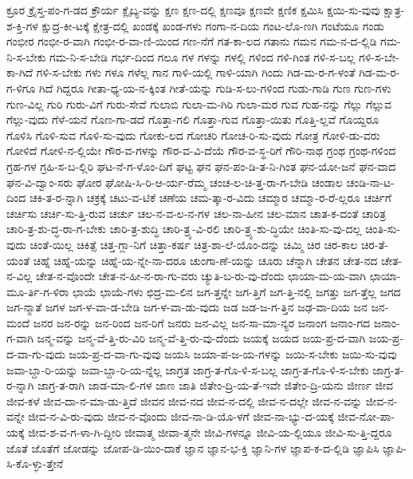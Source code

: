 {ಕ್ರೂರ
ಕ್ರೈಸ್ತ-ಪಂ-ಗ-ಡದ
ಕ್ರೌರ್ಯ
ಕ್ಲೈಬ್ಯ-ವನ್ನು
ಕ್ಷಣ
ಕ್ಷಣ-ದಲ್ಲಿ
ಕ್ಷಣವೂ
ಕ್ಷಣವೇ
ಕ್ಷಣಿಕ
ಕ್ಷಮಿಸಿ
ಕ್ಷಯಿ-ಸು-ವುವು
ಕ್ಷಾತ್ರ-ಶ-ಕ್ತಿ-ಗಳ
ಕ್ಷುದ್ರ-ಕೀ-ಟಕ್ಕೆ
ಕ್ಷೇತ್ರ-ದಲ್ಲಿ
ಖಂಡಕ್ಕೆ
ಖಂಡ-ಗಳು
ಗಂಗಾ-ನ-ದಿಯ
ಗಂಟ-ಲೊ-ಣಗಿ
ಗಂಟೆಯೂ
ಗಂಡು
ಗಂಭೀರ
ಗಂಭೀ-ರ-ವಾಗಿ
ಗಂಭೀ-ರ-ವಾ-ಣಿ-ಯಿಂದ
ಗಣ-ನೆಗೆ
ಗತ-ಕಾ-ಲದ
ಗತಾನು
ಗಮನ
ಗಮ-ನ-ದ-ಲ್ಲಿಡಿ
ಗಮ-ನಿ-ಸ-ಬೇಕು
ಗಮ-ನಿ-ಸ-ಬೇಡಿ
ಗರ್ಭ-ದಿಂದ
ಗಲೂ
ಗಳ
ಗಳನ್ನು
ಗಳಲ್ಲಿ
ಗಳಿಂದ
ಗಳಿ-ಗಿಂತ
ಗಳಿ-ಸ-ಬಲ್ಲ
ಗಳಿ-ಸ-ಬೇ-ಕಾ-ಗಿದೆ
ಗಳಿ-ಸ-ಬೇಕು
ಗಳು
ಗಳೂ
ಗಳೆಲ್ಲ
ಗಾನ
ಗಾಳಿ-ಯಲ್ಲಿ
ಗಾಳಿ-ಯಾಗಿ
ಗಿಂದು
ಗಿಡ-ಮ-ರ-ಗ-ಳಂತೆ
ಗಿಡ-ಮ-ರ-ಗ-ಳಿಗೂ
ಗಿದೆ
ಗಿದ್ದರೂ
ಗೀತಾ-ಧ್ಯ-ಯ-ನ-ಕ್ಕಿಂತ
ಗೀತೆ-ಯನ್ನು
ಗುಡಿ-ಸ-ಲು-ಗಳಿಂದ
ಗುಡು-ಗಾಡಿ
ಗುಣ
ಗುಣ-ಗಳು
ಗುಣ-ವಿಲ್ಲ
ಗುರಿ
ಗುರು-ವಿಗೆ
ಗುರು-ಸೇವೆ
ಗುಲಾಬಿ
ಗುಲಾ-ಮ-ಗಿರಿ
ಗುಲಾ-ಮರ
ಗುವ
ಗುಹ-ನನ್ನು
ಗೆಲ್ಲು
ಗೆಲ್ಲುವ
ಗೆಲ್ಲು-ವುದು
ಗೆಳೆ-ಯನೆ
ಗೊಣ-ಗಾ-ಡದೆ
ಗೊತ್ತಾ-ಗಲಿ
ಗೊತ್ತಾ-ಗುವ
ಗೊತ್ತಾ-ಯಿತು
ಗೊತ್ತಿ-ಲ್ಲವೆ
ಗೊಯ್ದರೂ
ಗೊಳಿಸಿ
ಗೊಳಿ-ಸುವ
ಗೊಳಿ-ಸು-ವುದು
ಗೋಕು-ಲದ
ಗೋಚರಿ
ಗೋಚ-ರಿ-ಸು-ವುದು
ಗೋತ್ರ
ಗೋಳಿ-ಡು-ವರು
ಗೋಳಿದೆ
ಗೋಳಿ-ನ-ಲ್ಲಿಯೇ
ಗೌರ-ವ-ಗಳನ್ನು
ಗೌರ-ವ-ವಿ-ದೆಯೆ
ಗೌರ-ವ-ಸ್ಥ-ರಿಗೆ
ಗೌರಿ-ನಾಥ
ಗ್ರಂಥ
ಗ್ರಂಥ-ಗಳಿಂದ
ಗ್ರಹ-ಗಳ
ಗ್ರಹಿ-ಸ-ಬ-ಲ್ಲಿರಿ
ಘಟ-ನೆ-ಗ-ಳೊಂ-ದಿಗೆ
ಘಟ್ಟ
ಘನ
ಘನ-ಪಂ-ಡಿ-ತ-ನಿ-ಗಿಂತ
ಘನ-ಯೋ-ಜನೆ
ಘನ-ವಾದ
ಘನ-ವಿ-ದ್ವಾಂ-ಸರು
ಘೋರ
ಘೋಷಿ-ಸಿ-ರಿ-ಆ-ರ್ಯ-ರೆಮ್ಮ
ಚಂಚ-ಲ-ಚಿ-ತ್ತ-ರಾ-ಗ-ಬೇಡಿ
ಚಂಡಾಲ
ಚಂಡಿ-ನಾ-ಟ-ದಿಂದ
ಚಕಿ-ತ-ರ-ನ್ನಾಗಿ
ಚಕ್ರಕ್ಕೆ
ಚಟು-ವ-ಟಿಕೆ
ಚಣೆಯ
ಚಮ-ತ್ಕಾ-ರ-ವಿದು
ಚಮ್ಮಾರ
ಚಮ್ಮಾ-ರ-ರೆ-ಲ್ಲರೂ
ಚರ್ಚಿಗೆ
ಚರ್ಚಿಸು
ಚರ್ಚಿ-ಸು-ತ್ತಿ-ರುವ
ಚರ್ಚು
ಚಲ-ನ-ವ-ಲ-ನ-ಗಳ
ಚಲ-ನಾ-ಹೀನ
ಚಲ-ಮಾನ
ಚಾತ-ಕ-ದಂತೆ
ಚಾರಿತ್ರ
ಚಾರಿ-ತ್ರ-ಶು-ದ್ಧ-ರಾ-ಗ-ಬೇಕು
ಚಾರಿ-ತ್ರ-ಶುದ್ಧಿ
ಚಾರಿ-ತ್ರ್ಯ-ವಿ-ರಲಿ
ಚಾರಿ-ತ್ರ್ಯ-ಶು-ದ್ಧಿಯೇ
ಚಿಂತಿ-ಸು-ವು-ದಲ್ಲ
ಚಿಂತಿ-ಸು-ವುದು
ಚಿಂತೆ-ಯಿಲ್ಲ
ಚಿಕಿತ್ಸೆ
ಚಿತ್ತ-ಗ್ಲಾ-ನಿಗೆ
ಚಿತ್ತಾ-ಕರ್ಷ
ಚಿತ್ರ-ಶಾ-ಲೆ-ಯೊಂ-ದನ್ನು
ಚಿಮ್ಮಿ
ಚಿರ
ಚಿರ-ಕಾಲ
ಚಿರ-ತೆ-ಯಂತೆ
ಚಿಹ್ನೆ
ಚಿಹ್ನೆ-ಯನ್ನು
ಚಿಹ್ನೆ-ಯ-ನ್ನೇ-ನಾ-ದರೂ
ಚುಂಗಾ-ಣೆ-ಯನ್ನು
ಚೂರು
ಚೆನ್ನಾಗಿ
ಚೇತನ
ಚೇತ-ನದ
ಚೇತ-ನ-ವಿಲ್ಲ
ಚೇತ-ನ-ವೊಂದೇ
ಚೇತ-ನ-ಹೀ-ನ-ರಾ-ಗು-ವರು
ಚ್ಯುತಿ-ಬ-ರು-ವು-ದೆಂದು
ಛಾಯಾ-ಮ-ಯ-ವಾಗಿ
ಛಾಯಾ-ಮೂ-ರ್ತಿ-ಗ-ಳಿರಾ
ಛಾಯೆ
ಛಾಯೆ-ಗಳು
ಛಿದ್ರ-ಮ-ಲಿನ
ಜಗ-ತ್ತನ್ನೇ
ಜಗ-ತ್ತಿಗೆ
ಜಗ-ತ್ತಿ-ನಲ್ಲಿ
ಜಗತ್ತು
ಜಗ-ತ್ತೆಲ್ಲ
ಜಗದ
ಜಗ-ನ್ಮಾತೆ
ಜಗಳ
ಜಗ-ಳ-ವಾ-ಡ-ಬೇಡಿ
ಜಗ-ಳ-ವಾ-ಡು-ವುದು
ಜಡ
ಜಡ-ಜ-ಗ-ತ್ತಿನ
ಜಢ-ವಾ-ದಿಯ
ಜನ
ಜನ-ಮಂದೆ
ಜನರ
ಜನ-ರನ್ನು
ಜನ-ರಿಂದ
ಜನ-ರಿಗೆ
ಜನರು
ಜನ-ವಿಲ್ಲ
ಜನ-ಸಾ-ಮಾ-ನ್ಯರ
ಜನಾಂಗ
ಜನಾಂ-ಗದ
ಜನಾಂ-ಗ-ವಾಗಿ
ಜನ್ಮ-ವನ್ನು
ಜನ್ಮ-ವೆ-ತ್ತಿ-ರು-ವಿರಿ
ಜನ್ಮ-ವೆ-ತ್ತಿ-ರು-ವು-ದೆಂದು
ಜಯಕ್ಕೆ
ಜಯದ
ಜಯ-ಪ್ರ-ದ-ವಾಗಿ
ಜಯ-ಪ್ರ-ದ-ವಾ-ಗು-ವುದು
ಜಯ-ಪ್ರ-ದ-ವಾ-ಗು-ವುವು
ಜಯಸಿ
ಜಯಾ-ಪ-ಜ-ಯ-ಗಳನ್ನು
ಜಯಿ-ಸ-ಬೇಕು
ಜಯಿ-ಸು-ವುವು
ಜವಾ-ಬ್ದಾ-ರಿ-ಯನ್ನು
ಜವಾ-ಬ್ದಾ-ರಿ-ಯ-ನ್ನೆಲ್ಲ
ಜಾಗ್ರತ
ಜಾಗ್ರ-ತ-ಗೊ-ಳಿ-ಸ-ಬಲ್ಲ
ಜಾಗ್ರ-ತ-ಗೊ-ಳಿ-ಸ-ಬೇಕು
ಜಾಗ್ರ-ತ-ರ-ನ್ನಾಗಿ
ಜಾಗ್ರ-ತ-ರಾಗಿ
ಜಾಡ-ಮಾ-ಲಿ-ಗಳ
ಜಾಣ
ಜಾತಿ
ಜಿತೇಂ-ದ್ರಿ-ಯ-ತೆ-ಇವೇ
ಜಿತೇಂ-ದ್ರಿ-ಯನು
ಜೀರ್ಣ
ಜೀವ
ಜೀವ-ಕಳೆ
ಜೀವ-ದಾ-ನ-ಮಾ-ಡು-ತ್ತಿದೆ
ಜೀವನ
ಜೀವ-ನದ
ಜೀವ-ನ-ದಲ್ಲಿ
ಜೀವ-ನ-ದಲ್ಲೇ
ಜೀವ-ನ-ವನ್ನು
ಜೀವ-ನ-ವನ್ನೇ
ಜೀವ-ನ-ವಿ-ರು-ವುದು
ಜೀವ-ನ-ವೊಂದು
ಜೀವ-ನಾ-ಡಿ-ಯೊ-ಳಗೆ
ಜೀವ-ನಾ-ಭ್ಯು-ದ-ಯಕ್ಕೆ
ಜೀವ-ನೋ-ಪಾ-ಯಕ್ಕೆ
ಜೀವ-ಶ-ವ-ಗ-ಳಾ-ಗಿ-ದ್ದೀರಿ
ಜೀವಾತ್ಮ
ಜೀವಾ-ತ್ಮನೇ
ಜೀವಿ-ಗಳನ್ನೂ
ಜೀವಿ-ಯ-ಲ್ಲಿಯೂ
ಜೀವಿ-ಸು-ತ್ತಿ-ದ್ದರೂ
ಜೊತೆ
ಜೊತೆಗೆ
ಜೋಡನ್ನು
ಜೋಪ-ಡಿ-ಯಿಂ-ದಾಕೆ
ಜ್ಞಾನ
ಜ್ಞಾನ-ಭ-ಕ್ತಿ
ಜ್ಞಾನಿ-ಗಳ
ಜ್ಞಾಪ-ಕ-ದ-ಲ್ಲಿಡಿ
ಜ್ಞಾಪಿಸಿ
ಜ್ಞಾಪಿ-ಸಿ-ಕೊ-ಳ್ಳು-ತ್ತೇನೆ
}

